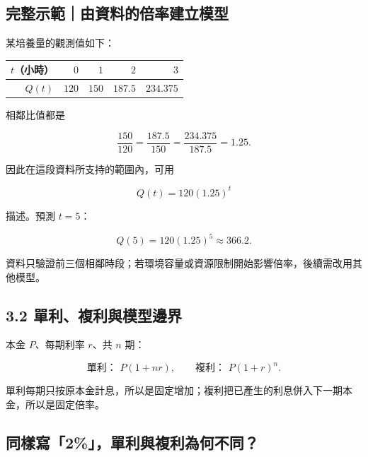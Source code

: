 \documentclass[11pt,a4paper]{article}
\newcounter{none}
\begin{document}
\begin{HandoutWorkedExample}

\subsection{完整示範｜由資料的倍率建立模型}\label{ux5b8cux6574ux793aux7bc4ux7531ux8cc7ux6599ux7684ux500dux7387ux5efaux7acbux6a21ux578b}

某培養量的觀測值如下：

{\def\LTcaptype{none} %
\begin{longtable}[]{@{}rrrrr@{}}
\toprule\noalign{}
\(t\)（小時） & \(0\) & \(1\) & \(2\) & \(3\) \\
\midrule\noalign{}
\endhead
\bottomrule\noalign{}
\endlastfoot
\(Q(t)\) & \(120\) & \(150\) & \(187.5\) & \(234.375\) \\
\end{longtable}
}

相鄰比值都是

\[
\frac{150}{120}
=\frac{187.5}{150}
=\frac{234.375}{187.5}
=1.25.
\]

因此在這段資料所支持的範圍內，可用

\[
\boxed{Q(t)=120(1.25)^t}
\]

描述。預測 \(t=5\)：

\[
Q(5)=120(1.25)^5\approx\boxed{366.2}.
\]

資料只驗證前三個相鄰時段；若環境容量或資源限制開始影響倍率，後續需改用其他模型。

\end{HandoutWorkedExample}

\subsection{3.2 單利、複利與模型邊界}\label{ux55aeux5229ux8907ux5229ux8207ux6a21ux578bux908aux754c}

本金 \(P\)、每期利率 \(r\)、共 \(n\) 期：

\[
\boxed{\text{單利： }P(1+nr)},
\qquad
\boxed{\text{複利： }P(1+r)^n}.
\]

單利每期只按原本金計息，所以是固定增加；複利把已產生的利息併入下一期本金，所以是固定倍率。

\subsection{同樣寫「2\%」，單利與複利為何不同？}\label{ux540cux6a23ux5beb2ux55aeux5229ux8207ux8907ux5229ux70baux4f55ux4e0dux540c}
\end{document}
